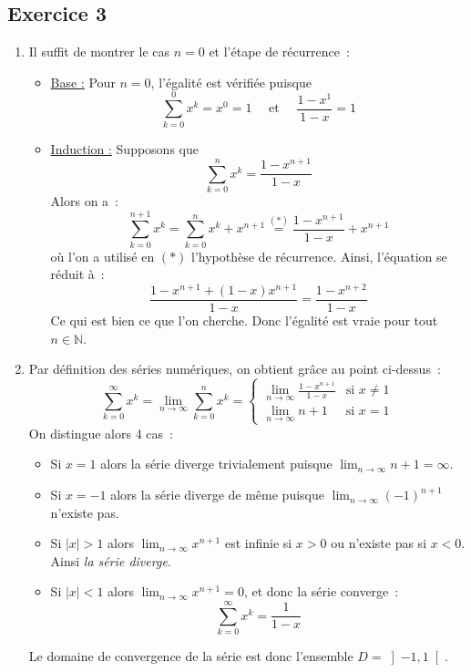 \documentclass{article}
\begin{document}
\subsection{Exercice 3}
\begin{enumerate}
    \item Il suffit de montrer le cas $n = 0$ et l'étape de récurrence~:
    \begin{itemize}
        \item \underline{Base :} Pour $n = 0$, l'égalité est vérifiée puisque
        \[
        \sum_{k = 0}^{0} x^k = x^0 = 1 \quad \textrm{ et } \quad \frac{1 - x^1}{1 - x} = 1
        \]
        \item \underline{Induction :} Supposons que 
        \[
        \sum_{k = 0}^{n} x^k = \frac{1 - x^{n+1}}{1-x}
        \]
        Alors on a~:
        \[
        \sum_{k = 0}^{n+1} x^k = \sum_{k = 0}^{n} x^k + x^{n+1} \overset{(*)}{=} \frac{1 - x^{n+1}}{1-x} + x^{n+1}
        \]
        où l'on a utilisé en $(*)$ l'hypothèse de récurrence. Ainsi, l'équation se réduit à~:
        \[
        \frac{1-x^{n+1} + (1-x)x^{n+1}}{1-x} = \frac{1 - x^{n+2}}{1-x}
        \]
        Ce qui est bien ce que l'on cherche. Donc l'égalité est vraie pour tout $n \in \mathbb{N}$.
    \end{itemize}
    
    \item Par définition des séries numériques, on obtient grâce au point ci-dessus~:
    \[
    \sum_{k = 0}^{\infty} x^k = \lim_{n \to \infty} \sum_{k = 0}^{n} x^k = \begin{cases}
    \displaystyle\lim_{n \to \infty} \frac{1 - x^{n+1}}{1-x} & \textrm{si } x \neq 1 \\
    \displaystyle\lim_{n \to \infty} n + 1 & \textrm{si } x = 1
    \end{cases}
    \]
    On distingue alors 4 cas~:
    \begin{itemize}
        \item Si $x = 1$ alors la série diverge trivialement puisque $\displaystyle\lim_{n \to \infty} n + 1 = \infty$.
        \item Si $x = -1$ alors la série diverge de même puisque $\displaystyle\lim_{n \to \infty} (-1)^{n+1}$ n'existe pas.
        \item Si $|x| > 1$ alors $\displaystyle\lim_{n \to \infty} x^{n+1}$ est infinie si $x > 0$ ou n'existe pas si $x < 0$. Ainsi \emph{la série diverge}.
        \item Si $|x| < 1$ alors $\displaystyle\lim_{n \to \infty} x^{n+1} = 0$, et donc la série converge~:
        \[
        \boxed{
        \sum_{k = 0}^{\infty} x^k = \frac{1}{1-x}
        }
        \]
    \end{itemize}
    Le domaine de convergence de la série est donc l'ensemble $D = \left ] -1, 1 \right [$.
\end{enumerate}
\end{document}
